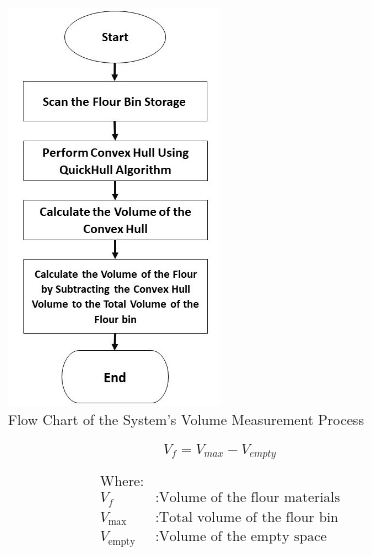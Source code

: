 \begin{figure}[H]
	\centering
	\includegraphics[width=0.5\textwidth, height=0.9\textwidth]{Figures/volume-estimation-process}
	\caption{Flow Chart of the System's Volume Measurement Process}
	\label{ch3:fig:volume-measurement-process}
\end{figure}

\begin{equation}
	\label{ch4:eq:volume}
	V_f = V_{max} - V_{empty}
\end{equation}

\begin{align*}
	 & \text{Where:}    &                                          \\
	 & V_f              & : \text{Volume of the flour materials}   \\
	 & V_{\text{max}}   & : \text{Total volume of the flour bin}   \\
	 & V_{\text{empty}} & : \text{Volume of the empty space}     &
\end{align*}



